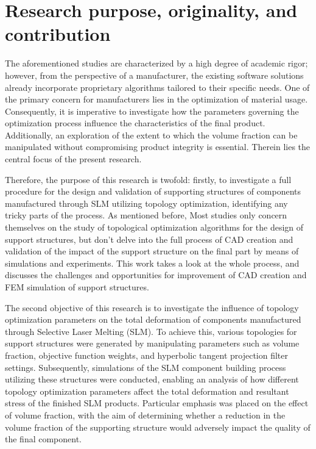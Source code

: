 \documentclass[../main.tex]{subfiles}
\begin{document}
\section{Research purpose, originality, and contribution}

The aforementioned studies are characterized by a high degree of academic rigor; however, from the perspective of a manufacturer, the existing software solutions already incorporate proprietary algorithms tailored to their specific needs. One of the primary concern for manufacturers lies in the optimization of material usage. Consequently, it is imperative to investigate how the parameters governing the optimization process influence the characteristics of the final product. Additionally, an exploration of the extent to which the volume fraction can be manipulated without compromising product integrity is essential. Therein lies the central focus of the present research.

Therefore, the purpose of this research is twofold: firstly, to investigate a full procedure for the design and validation of supporting structures of components manufactured through SLM utilizing topology optimization, identifying any tricky parts of the process. As mentioned before, Most studies only concern themselves on the study of topological optimization algorithms for the design of support structures, but don't delve into the full process of CAD creation and validation of the impact of the support structure on the final part by means of simulations and experiments. This work takes a look at the whole process, and discusses the challenges and opportunities for improvement of CAD creation and FEM simulation of support structures. 

The second objective of this research is to investigate the influence of topology optimization parameters on the total deformation of components manufactured through Selective Laser Melting (SLM). To achieve this, various topologies for support structures were generated by manipulating parameters such as volume fraction, objective function weights, and hyperbolic tangent projection filter settings. Subsequently, simulations of the SLM component building process utilizing these structures were conducted, enabling an analysis of how different topology optimization parameters affect the total deformation and resultant stress of the finished SLM products. Particular emphasis was placed on the effect of volume fraction, with the aim of determining whether a reduction in the volume fraction of the supporting structure would adversely impact the quality of the final component.
\end{document}
